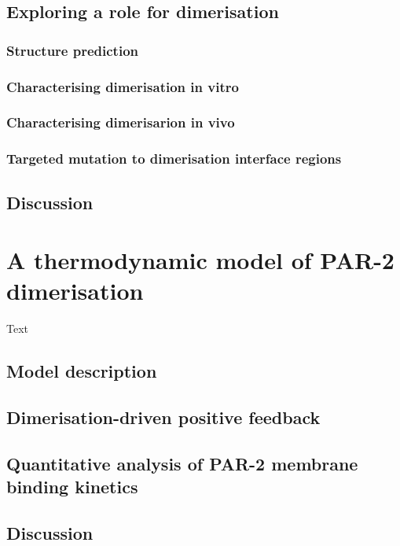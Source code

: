 \documentclass[11pt]{"article"}
\begin{document}
\subsection{Exploring a role for dimerisation}
\subsubsection{Structure prediction}
\subsubsection{Characterising dimerisation in vitro}
\subsubsection{Characterising dimerisarion in vivo}
\subsubsection{Targeted mutation to dimerisation interface regions}

\subsection{Discussion}


\clearpage
\section{A thermodynamic model of PAR-2 dimerisation}

Text

\subsection{Model description}

\subsection{Dimerisation-driven positive feedback}

\subsection{Quantitative analysis of PAR-2 membrane binding kinetics}

\subsection{Discussion}
\end{document}
